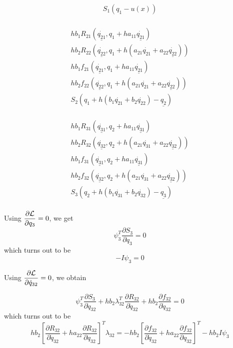 \documentclass[10pt,letter]{book}
\newcommand{\pd}[2]{\dfrac{\partial #1}{\partial #2}}
\begin{document}
     \begin{eqnarray}\nonumber
       S_1({q_1} - u(x))\\\nonumber
     \end{eqnarray}

     \begin{eqnarray}\nonumber
       h b_1 R_{21}\left( \underline{\dot{q_{21}}}, q_1 + h a_{11} \underline{\dot{q_{21}}}  \right)\\ \nonumber
       h b_2 R_{22}( \underline{\dot{q_{22}}}, q_1 + h (a_{21} \dot{q_{21}} + a_{22} \underline{\dot{q_{22}}}) )\\ \nonumber
       h b_1 f_{21}\left( \underline{\dot{q_{21}}}, q_1 + h a_{11} \underline{\dot{q_{21}}}  \right)\\ \nonumber
       h b_2 f_{22}( \underline{\dot{q_{22}}}, q_1 + h (a_{21} \dot{q_{21}} + a_{22} \underline{\dot{q_{22}}}) )\\ \nonumber
       S_2(  q_1 + h ( b_1\dot{q_{21}} + b_2\dot{q_{22}} ) - \underline{q_2})\\\nonumber
     \end{eqnarray}

     \begin{eqnarray}\nonumber
       h b_1 R_{31}\left( \underline{\dot{q_{31}}}, q_2 + h a_{11} \underline{\dot{q_{31}}}  \right)\\ \nonumber
       h b_2 R_{32}( \underline{\dot{q_{32}}}, q_2 + h (a_{21} \dot{q_{31}} + a_{22} \underline{\dot{q_{32}}}) )\\ \nonumber
       h b_1 f_{31}\left( \underline{\dot{q_{31}}}, q_2 + h a_{11} \underline{\dot{q_{31}}}  \right)\\ \nonumber
       h b_2 f_{32}( \underline{\dot{q_{32}}}, q_2 + h (a_{21} \dot{q_{31}} + a_{22} \underline{\dot{q_{32}}}) )\\ \nonumber
       S_3(q_2 + h ( b_1\dot{q_{31}} + b_2\dot{q_{32}} ) - \underline{q_3})\\\nonumber
     \end{eqnarray}

     Using $ \pd{{\cal L}}{q_3} = 0 $, we get  
     $$ \psi_3^T \pd{S_3}{q_3} = 0 $$
     which turns out to be
     $$ -{I} \psi_3 = 0$$

     Using $\pd{{\cal L}}{\dot{q}_{32}}=0 $, we obtain

     $$ \psi_3^T \pd{S_3}{\dot{q}_{32}} 
     + hb_2\lambda_{32}^T \pd{R_{32}}{\dot{q}_{32}} 
     + hb_2\pd{f_{32}}{\dot{q}_{32}} = 0 $$
     which turns out to be
     $$ hb_2\left[ \pd{R_{32}}{\dot{q}_{32}} + ha_{22}  \pd{R_{32}}{{q}_{32}} \right]^T\lambda_{32} = 
     - hb_2\left[ \pd{f_{32}}{\dot{q}_{32}} + ha_{22}  \pd{f_{32}}{{q}_{32}} \right]^T 
     - hb_2I \psi_3 $$
\end{document}
